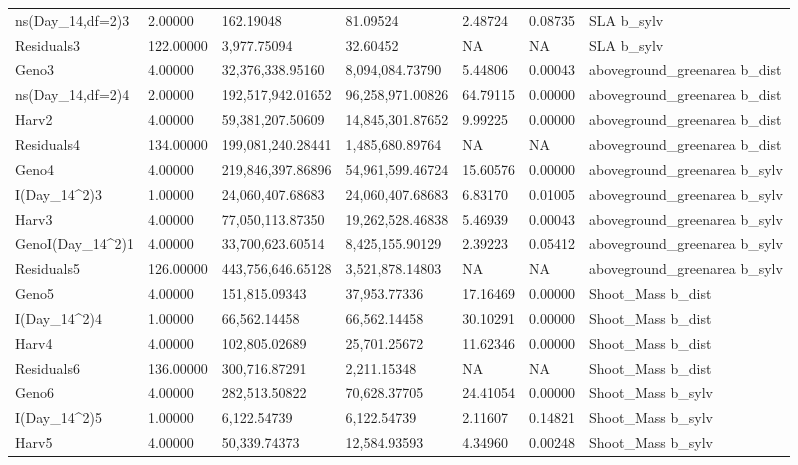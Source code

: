 \documentclass[jou,floatsintext]{apa6}
\begin{document}
\begin{table}[tbp]
\begin{center}
\begin{threeparttable}
{\begin{tabular}{lllllll}
ns(Day\_14,df=2)3 & 2.00000 & 162.19048 & 81.09524 & 2.48724 & 0.08735 & SLA b\_sylv\\
Residuals3 & 122.00000 & 3,977.75094 & 32.60452 & NA & NA & SLA b\_sylv\\
Geno3 & 4.00000 & 32,376,338.95160 & 8,094,084.73790 & 5.44806 & 0.00043 & aboveground\_greenarea b\_dist\\
ns(Day\_14,df=2)4 & 2.00000 & 192,517,942.01652 & 96,258,971.00826 & 64.79115 & 0.00000 & aboveground\_greenarea b\_dist\\
Harv2 & 4.00000 & 59,381,207.50609 & 14,845,301.87652 & 9.99225 & 0.00000 & aboveground\_greenarea b\_dist\\
Residuals4 & 134.00000 & 199,081,240.28441 & 1,485,680.89764 & NA & NA & aboveground\_greenarea b\_dist\\
Geno4 & 4.00000 & 219,846,397.86896 & 54,961,599.46724 & 15.60576 & 0.00000 & aboveground\_greenarea b\_sylv\\
I(Day\_14\textasciicircum{}2)3 & 1.00000 & 24,060,407.68683 & 24,060,407.68683 & 6.83170 & 0.01005 & aboveground\_greenarea b\_sylv\\
Harv3 & 4.00000 & 77,050,113.87350 & 19,262,528.46838 & 5.46939 & 0.00043 & aboveground\_greenarea b\_sylv\\
GenoI(Day\_14\textasciicircum{}2)1 & 4.00000 & 33,700,623.60514 & 8,425,155.90129 & 2.39223 & 0.05412 & aboveground\_greenarea b\_sylv\\
Residuals5 & 126.00000 & 443,756,646.65128 & 3,521,878.14803 & NA & NA & aboveground\_greenarea b\_sylv\\
Geno5 & 4.00000 & 151,815.09343 & 37,953.77336 & 17.16469 & 0.00000 & Shoot\_Mass b\_dist\\
I(Day\_14\textasciicircum{}2)4 & 1.00000 & 66,562.14458 & 66,562.14458 & 30.10291 & 0.00000 & Shoot\_Mass b\_dist\\
Harv4 & 4.00000 & 102,805.02689 & 25,701.25672 & 11.62346 & 0.00000 & Shoot\_Mass b\_dist\\
Residuals6 & 136.00000 & 300,716.87291 & 2,211.15348 & NA & NA & Shoot\_Mass b\_dist\\
Geno6 & 4.00000 & 282,513.50822 & 70,628.37705 & 24.41054 & 0.00000 & Shoot\_Mass b\_sylv\\
I(Day\_14\textasciicircum{}2)5 & 1.00000 & 6,122.54739 & 6,122.54739 & 2.11607 & 0.14821 & Shoot\_Mass b\_sylv\\
Harv5 & 4.00000 & 50,339.74373 & 12,584.93593 & 4.34960 & 0.00248 & Shoot\_Mass b\_sylv\\

\end{tabular}}
\end{threeparttable}
\end{center}
\end{table}
\end{document}
